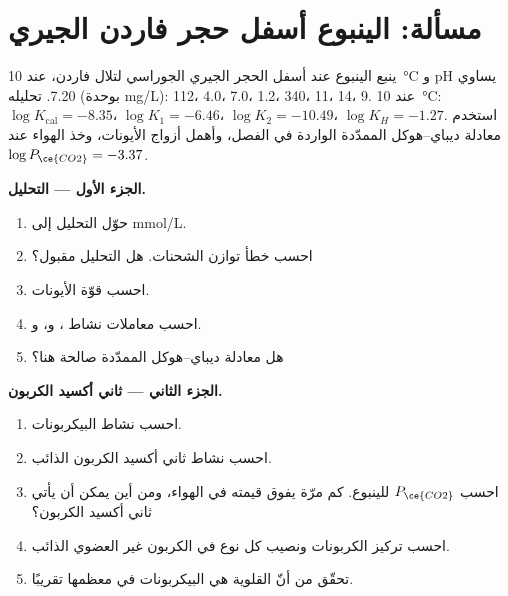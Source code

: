 \section{مسألة: الينبوع أسفل حجر فاردن الجيري}

\begin{problem}
\label{pb:b3:water-rock-interaction:1}
ينبع الينبوع عند أسفل الحجر الجيري الجوراسي لتلال فاردن، عند
\qty{10}{\celsius} و pH يساوي 7.20. تحليله (بوحدة \unit{mg/L}): 
112،  4.0،  7.0،  1.2،  340،  11،
 14،  9. عند \qty{10}{\celsius}: $\log K_{\mathrm{cal}} =
-8.35$، $\log K_1 = -6.46$، $\log K_2 = -10.49$، $\log K_H = -1.27$. استخدم
معادلة ديباي--هوكل الممدّدة الواردة في الفصل، وأهمل أزواج الأيونات، وخذ
الهواء عند $\log P_{\ce{CO2}} = -3.37$.

\medskip\noindent\textbf{الجزء الأول --- التحليل.}
\begin{enumerate}
\item حوّل التحليل إلى \unit{mmol/L}.
\item احسب خطأ توازن الشحنات. هل التحليل مقبول؟
\item احسب قوّة الأيونات.
\item احسب معاملات نشاط ، و،
  و.
\item هل معادلة ديباي--هوكل الممدّدة صالحة هنا؟
\end{enumerate}

\medskip\noindent\textbf{الجزء الثاني --- ثاني أكسيد الكربون.}
\begin{enumerate}[resume]
\item احسب نشاط البيكربونات.
\item احسب نشاط ثاني أكسيد الكربون الذائب.
\item احسب $P_{\ce{CO2}}$ للينبوع. كم مرّة يفوق قيمته في الهواء،
  ومن أين يمكن أن يأتي ثاني أكسيد الكربون؟
\item احسب تركيز الكربونات ونصيب كل نوع في
  الكربون غير العضوي الذائب.
\item تحقّق من أنّ القلوية هي البيكربونات في معظمها تقريبًا.
\end{enumerate}


\end{problem}
